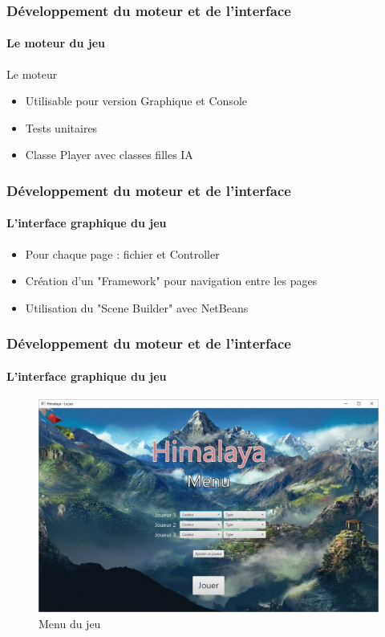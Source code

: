	\begin{frame}
		\frametitle{Développement du moteur et de l'interface}
		\framesubtitle{Le moteur du jeu}
		\begin{block}{Le moteur}
			\begin{itemize}
				\item Utilisable pour version Graphique et Console
				\item Tests unitaires
				\item Classe Player avec classes filles IA
			\end{itemize}
		\end{block}	
	\end{frame}

	\begin{frame}
		\frametitle{Développement du moteur et de l'interface}
		\framesubtitle{L'interface graphique du jeu}
		\begin{block}{\fx}
			\begin{itemize}
				\item Pour chaque page : fichier \fxml et Controller 
				\item Création d'un "Framework" pour navigation entre les pages
				\item Utilisation du "Scene Builder" avec NetBeans
			\end{itemize}
		\end{block}	
	\end{frame}
	
	\begin{frame}
		\frametitle{Développement du moteur et de l'interface}
		\framesubtitle{L'interface graphique du jeu}
		\begin{figure}[h]
			\centering
			\includegraphics[width=0.8\linewidth]{images/menu}
			\caption{Menu du jeu}
			\label{fig:menu}
		\end{figure}
	\end{frame}
	
